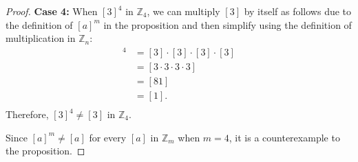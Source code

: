 \documentclass[11 pt]{article}
\newcommand{\newpar}{\vspace{.15in}\noindent}
\begin{document}
\begin{proof}
\newpar
\textbf{Case 4:} When $[3]^4$ in $\mathbb{Z}_4$, we can multiply $[3]$ by itself as follows due to the definition of $[a]^m$ in the proposition and then simplify using the definition of multiplication in $\mathbb{Z}_n$:
\begin{align*}
[3]^4&=[3]\cdot[3]\cdot[3]\cdot[3] \\
&= [3\cdot 3\cdot 3\cdot 3] \\
&= [81] \\
&= [1]. \\
\end{align*}
\noindent
Therefore, $[3]^4\not=[3]$ in $\mathbb{Z}_4$.

\newpar
Since $[a]^m\not=[a]$ for every $[a]$ in $\mathbb{Z}_m$ when $m=4$, it is a counterexample to the proposition.
\end{proof}
\end{document}
